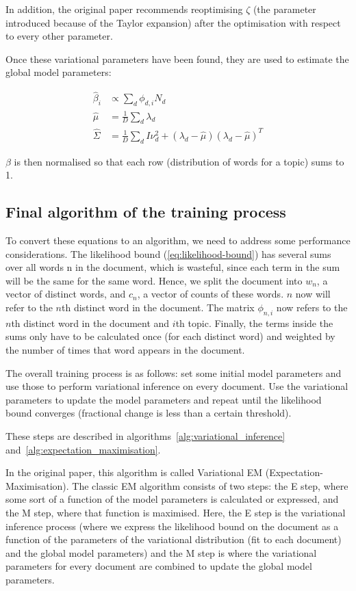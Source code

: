 \documentclass[12pt,a4paper,twoside,openright]{report}
\begin{document}
In addition, the original paper recommends reoptimising $\zeta$ (the parameter introduced because of the Taylor expansion) after the optimisation with respect to every other parameter.

Once these variational parameters have been found, they are used to estimate the global model parameters:

\begin{align}
\hat\beta_i & \propto \sum\limits_d\phi_{d, i}N_d \\ \label{eq:betaopt}
\hat\mu & = \frac{1}{D} \sum\limits_d\lambda_d \\ 
\hat\Sigma & = \frac{1}{D} \sum\limits_d I\nu^2_d + (\lambda_d - \hat\mu)(\lambda_d - \hat\mu)^T
\end{align}

$\beta$ is then normalised so that each row (distribution of words for a topic) sums to 1.

\subsection{Final algorithm of the training process}

To convert these equations to an algorithm, we need to address some performance considerations. The likelihood bound (\ref{eq:likelihood-bound}) has several sums over all words n in the document, which is wasteful, since each term in the sum will be the same for the same word. Hence, we split the document into $w_n$, a vector of distinct words, and $c_n$, a vector of counts of these words. $n$ now will refer to the $n$th distinct word in the document. The matrix $\phi_{n, i}$ now refers to the $n$th distinct word in the document and $i$th topic. Finally, the terms inside the sums only have to be calculated once (for each distinct word) and weighted by the number of times that word appears in the document.

The overall training process is as follows: set some initial model parameters and use those to perform variational inference on every document. Use the variational parameters to update the model parameters and repeat until the likelihood bound converges (fractional change is less than a certain threshold).

These steps are described in algorithms~\ref{alg:variational_inference} and~\ref{alg:expectation_maximisation}.

In the original paper, this algorithm is called Variational EM (Expectation-Maximisation). The classic EM algorithm consists of two steps: the E step, where some sort of a function of the model parameters is calculated or expressed, and the M step, where that function is maximised. Here, the E step is the variational inference process (where we express the likelihood bound on the document as a function of the parameters of the variational distribution (fit to each document) and the global model parameters) and the M step is where the variational parameters for every document are combined to update the global model parameters.
\end{document}
